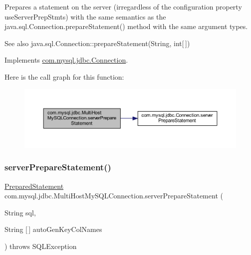 Prepares a statement on the server (irregardless of the configuration property \textquotesingle{}use\+Server\+Prep\+Stmts\textquotesingle{}) with the same semantics as the java.\+sql.\+Connection.\+prepare\+Statement() method with the same argument types.

\begin{DoxySeeAlso}{See also}
java.\+sql.\+Connection\+::prepare\+Statement(\+String, int\mbox{[}$\,$\mbox{]}) 
\end{DoxySeeAlso}


Implements \mbox{\hyperlink{interfacecom_1_1mysql_1_1jdbc_1_1_connection_ad56f84a142159320cb267e94febd72d9}{com.\+mysql.\+jdbc.\+Connection}}.

Here is the call graph for this function\+:
\nopagebreak
\begin{figure}[H]
\begin{center}
\leavevmode
\includegraphics[width=350pt]{classcom_1_1mysql_1_1jdbc_1_1_multi_host_my_s_q_l_connection_a62feb6ab7216c441bae377f5b7c738ac_cgraph}
\end{center}
\end{figure}
\mbox{\label{classcom_1_1mysql_1_1jdbc_1_1_multi_host_my_s_q_l_connection_a406fc0eb56f50ed44dc36158ab45e8d0}} 
\subsubsection{\texorpdfstring{server\+Prepare\+Statement()}{serverPrepareStatement()}\hspace{0.1cm}{\footnotesize\ttfamily [5/6]}}
{\footnotesize\ttfamily \mbox{\hyperlink{classcom_1_1mysql_1_1jdbc_1_1_prepared_statement}{Prepared\+Statement}} com.\+mysql.\+jdbc.\+Multi\+Host\+My\+S\+Q\+L\+Connection.\+server\+Prepare\+Statement (\begin{DoxyParamCaption}\item[{String}]{sql,  }\item[{String \mbox{[}$\,$\mbox{]}}]{auto\+Gen\+Key\+Col\+Names }\end{DoxyParamCaption}) throws S\+Q\+L\+Exception}

